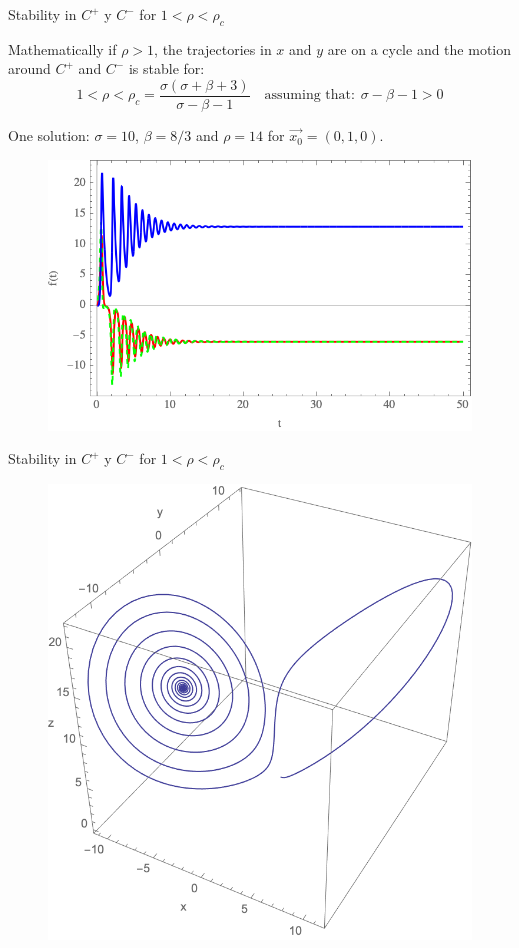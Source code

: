 \documentclass[hyperref={pdfpagelabels=false}]{beamer}
\begin{document}
\begin{frame}{Stability in $C^{+}$ y $C^{-}$ for $1<\rho<\rho_{c}$}

Mathematically if $\rho>1$, the trajectories in $x$ and $y$ are on a cycle and the motion around $C^{+}$ and $C^{-}$ is stable for:
\begin{equation*}
1<\rho<\rho_{c}=\frac{\sigma(\sigma + \beta + 3)}{\sigma -\beta -1} \quad \text{assuming that:} \hspace{5pt} \sigma - \beta -1 >0
\end{equation*}

\vspace{-5pt}
\begin{block}{One solution:}
\centering
$\sigma=10$, $\beta=8/3$ and $\rho=14$ for $\Vec{x_{0}}=(0,1,0)$.
\end{block}

\begin{figure}

\includegraphics[width=0.6\linewidth]{Figures/estabilidad.png}

\end{figure}

\end{frame}

\begin{frame}{Stability in $C^{+}$ y $C^{-}$ for $1<\rho<\rho_{c}$}

\begin{figure}

\includegraphics[width=0.6\linewidth]{Figures/espiral.png}

\end{figure}

\end{frame}
\end{document}
